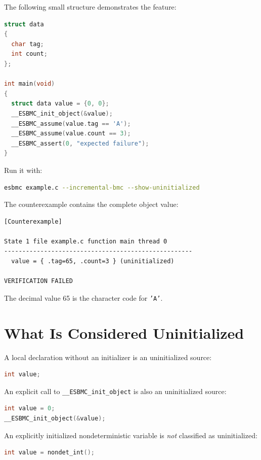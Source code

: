\documentclass[11pt]{article}
\begin{document}
The following small structure demonstrates the feature:

\begin{lstlisting}[language=C]
struct data
{
  char tag;
  int count;
};

int main(void)
{
  struct data value = {0, 0};
  __ESBMC_init_object(&value);
  __ESBMC_assume(value.tag == 'A');
  __ESBMC_assume(value.count == 3);
  __ESBMC_assert(0, "expected failure");
}
\end{lstlisting}

Run it with:

\begin{lstlisting}[language=bash]
esbmc example.c --incremental-bmc --show-uninitialized
\end{lstlisting}

The counterexample contains the complete object value:

\begin{lstlisting}
[Counterexample]

State 1 file example.c function main thread 0
----------------------------------------------------
  value = { .tag=65, .count=3 } (uninitialized)

VERIFICATION FAILED
\end{lstlisting}

The decimal value 65 is the character code for \texttt{'A'}.

\section{What Is Considered Uninitialized}

A local declaration without an initializer is an uninitialized source:

\begin{lstlisting}[language=C]
int value;
\end{lstlisting}

An explicit call to \texttt{\_\_ESBMC\_init\_object} is also an uninitialized
source:

\begin{lstlisting}[language=C]
int value = 0;
__ESBMC_init_object(&value);
\end{lstlisting}

An explicitly initialized nondeterministic variable is \emph{not} classified
as uninitialized:

\begin{lstlisting}[language=C]
int value = nondet_int();
\end{lstlisting}
\end{document}
